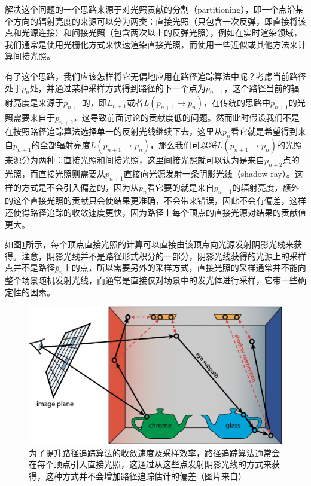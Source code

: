 解决这个问题的一个思路来源于对光照贡献的分割（partitioning），即一个点沿某个方向的辐射亮度的来源可以分为两类：直接光照（只包含一次反弹，即直接将该点和光源连接）和间接光照（包含两次以上的反弹光照），例如在实时渲染领域，我们通常是使用光栅化方式来快速渲染直接光照，而使用一些近似或其他方法来计算间接光照。

有了这个思路，我们应该怎样将它无偏地应用在路径追踪算法中呢？考虑当前路径处于$p_{n}$处，并通过某种采样方式得到路径的下一个点为$p_{n+1}$，这个路径当前的辐射亮度是来源于$p_{n+1}$的，即$L_{n+1}$或者$L(p_{n+1}\to p_n)$，在传统的思路中$p_{n+1}$的光照需要来自于$p_{n+2}$，这导致前面讨论的贡献度低的问题。然而此时假设我们不是在按照路径追踪算法选择单一的反射光线继续下去，这里从$p_n$看它就是希望得到来自$p_{n+1}$的全部辐射亮度$L(p_{n+1}\to p_n)$，那么我们可以将$L(p_{n+1}\to p_n)$的光照来源分为两种：直接光照和间接光照，这里间接光照就可以认为是来自$p_{n+2}$点的光照，而直接光照则需要从$p_{n+1}$直接向光源发射一条阴影光线（shadow ray）。这样的方式是不会引入偏差的，因为从$p_{n}$看它要的就是来自$p_{n+1}$的辐射亮度，额外的这个直接光照的贡献只会使结果更准确，不会带来错误，因此不会有偏差，这样还使得路径追踪的收敛速度更快，因为路径上每个顶点的直接光源对结果的贡献值更大。

如图\ref{f:pt-shadow-rays}所示，每个顶点直接光照的计算可以直接由该顶点向光源发射阴影光线来获得。注意，阴影光线并不是路径形式积分的一部分，阴影光线获得的光源上的采样点并不是路径$\bar{p}_n$上的点，所以需要另外的采样方式，直接光照的采样通常并不能向整个场景随机发射光线，而通常是直接仅对场景中的发光体进行采样，它带一些确定性的因素。

\begin{figure}
	\includegraphics[width=1.0\textwidth]{figures/pt/direct-indirect}
	\caption{为了提升路径追踪算法的收敛速度及采样效率，路径追踪算法通常会在每个顶点引入直接光照，这通过从这些点发射阴影光线的方式来获得，这种方式并不会增加路径追踪估计的偏差（图片来自\cite{a:ThePathtoPath-TracedMovies}）}
	\label{f:pt-shadow-rays}
\end{figure}

